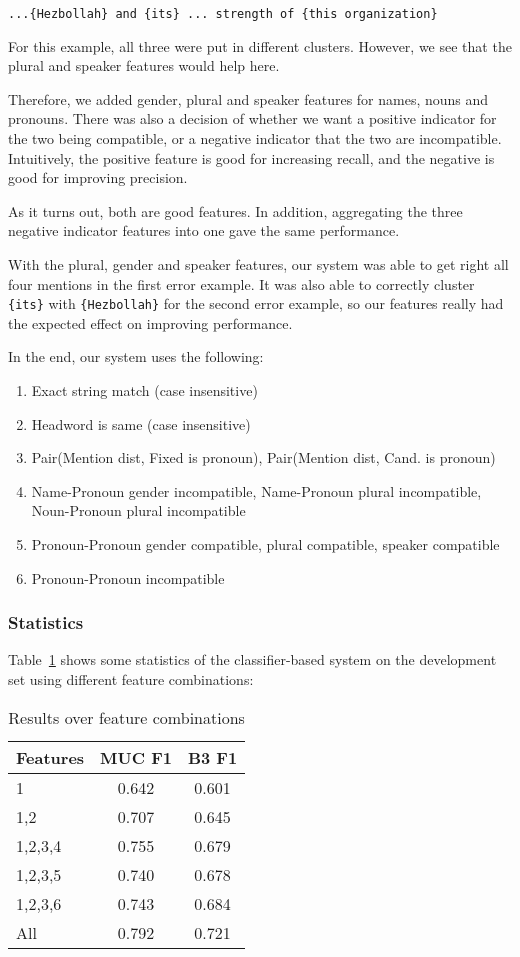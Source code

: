 \documentclass[12pt, twocolumn]{article}
\begin{document}
\texttt{...{\{Hezbollah\}} and {\{its}\}  ... strength of \{{this organization}\}}

For this example, all three were put in different clusters. However, we see that the plural and speaker features would help here.

Therefore, we added gender, plural and speaker features for names, nouns and pronouns. There was also a decision of whether we want a positive indicator for the two being compatible, or a negative indicator that the two are incompatible. Intuitively, the positive feature is good for increasing recall, and the negative is good for improving precision.

As it turns out, both are good features. In addition, aggregating the three negative indicator features into one gave the same performance.

With the plural, gender and speaker features, our system was able to get right all four mentions in the first error example.
It was also able to correctly cluster \texttt{\{its\}} with \texttt{\{Hezbollah\}} for the second error example, so our features really had the expected effect on improving performance.

In the end, our system uses the following:
\begin{enumerate}[(1)]
\item Exact string match (case insensitive)
\item Headword is same (case insensitive)
\item Pair(Mention dist, Fixed is pronoun), Pair(Mention dist, Cand. is pronoun) 
\item Name-Pronoun gender incompatible, Name-Pronoun plural incompatible, Noun-Pronoun plural incompatible
\item Pronoun-Pronoun gender compatible, plural compatible, speaker compatible
\item Pronoun-Pronoun incompatible
\end{enumerate}
\subsubsection{Statistics}
Table~\ref{tab:features} shows some statistics of the classifier-based system on the development set using different feature combinations:
\begin{table}[H]
\begin{center}
\begin{tabular}{|l|c|c|}
\hline
Features & MUC F1 & B3 F1\\\hline
1 & 0.642 & 0.601 \\\hline
1,2 & 0.707 & 0.645 \\\hline
1,2,3,4 & 0.755 & 0.679\\\hline
1,2,3,5 & 0.740 & 0.678\\\hline
1,2,3,6 & 0.743 & 0.684 \\\hline
All & 0.792 & 0.721 \\\hline
\end{tabular}
\end{center}
\caption{Results over feature combinations}
\label{tab:features}
\end{table}
\end{document}
